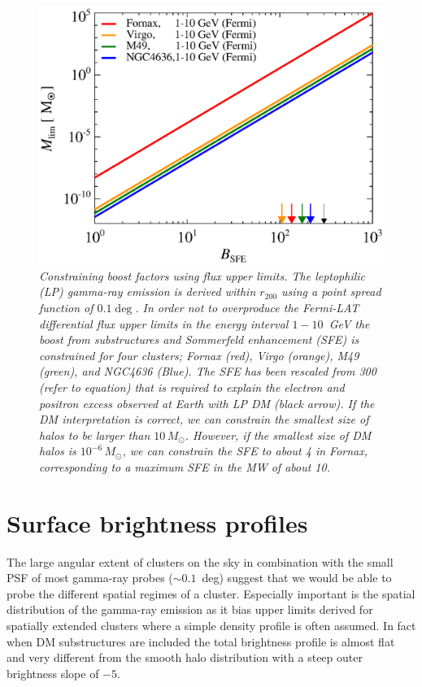 \documentclass[10pt,aps,pra,reprint,amsmath,amsfonts,amssymb,showpacs]{revtex4-1}
\newcommand{\msun}{M_\odot}
\newcommand{\rvir}{r_{200}}
\begin{document}
\begin{figure}%
 \includegraphics[width=0.99\columnwidth]{figures/LP.const.diff.v10.0.1deg.1.6T.SubMass.SF300.IR2.noMW.woGal.eps}
\caption{\it Constraining boost factors using flux upper limits. The
  leptophilic (LP) gamma-ray emission is derived within $\rvir$ using
  a point spread function of $0.1\deg$. In order not to overproduce
  the Fermi-LAT differential flux upper limits in the energy interval
  $1-10$~GeV the boost from substructures and Sommerfeld enhancement
  (SFE) is constrained for four clusters; Fornax (red), Virgo
  (orange), M49 (green), and NGC4636 (Blue). The SFE has been rescaled
  from 300 (refer to equation) that is required to explain the
  electron and positron excess observed at Earth with LP DM (black
  arrow). If the DM interpretation is correct, we can constrain the
  smallest size of halos to be larger than $10\,\msun$. However, if
  the smallest size of DM halos is $10^{-6}\,\msun$, we can constrain
  the SFE to about 4 in Fornax, corresponding to a maximum SFE in the
  MW of about 10.}
 \label{fig:boost_const}
\end{figure}


\section{Surface brightness profiles}
\label{sect:spatial}
The large angular extent of clusters on the sky in combination with
the small PSF of most gamma-ray probes ($\sim 0.1$~deg) suggest that
we would be able to probe the different spatial regimes of a
cluster. Especially important is the spatial distribution of the
gamma-ray emission as it bias upper limits derived for spatially
extended clusters where a simple density profile is often assumed. In
fact when DM substructures are included the total brightness profile
is almost flat and very different from the smooth halo distribution
with a steep outer brightness slope of $-5$.
\end{document}

